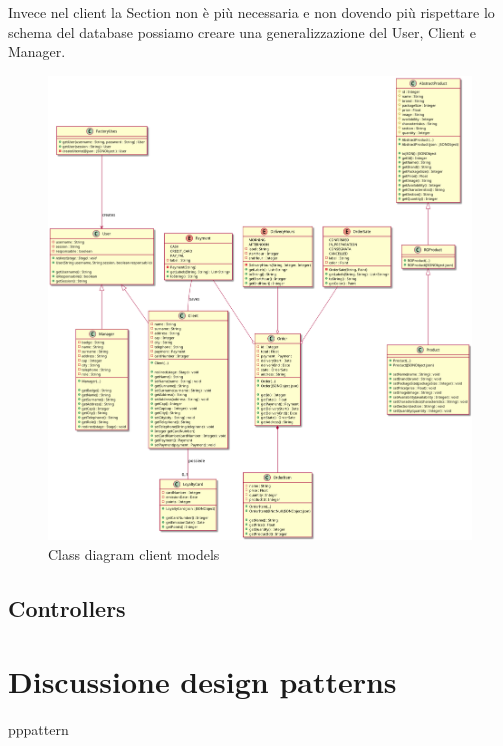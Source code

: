 \documentclass[12pt, a4paper]{article}
\begin{document}
Invece nel client la Section non è più necessaria e non dovendo più rispettare lo
schema del database possiamo creare una generalizzazione del User, Client e Manager.

\begin{figure}[H]
\centering
\includegraphics[width=\linewidth]{client_models_class.png}
\caption{Class diagram client models}
\end{figure}


\subsection{Controllers}


\section{Discussione design patterns}

pppattern

\end{document}
